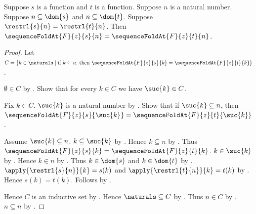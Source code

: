 \begin{proposition}\label{sequence_fold_at_prefix_extensional}
    Suppose $s$ is a function and $t$ is a function.
    Suppose $n$ is a natural number.
    Suppose $n\subseteq\dom{s}$ and $n\subseteq\dom{t}$.
    Suppose $\restrl{s}{n}=\restrl{t}{n}$.
    Then $\sequenceFoldAt{F}{z}{s}{n}
        =\sequenceFoldAt{F}{z}{t}{n}$.
\end{proposition}
\begin{proof}
    Let $C=\{k\in\naturals\mid
        \text{if $k\subseteq n$, then
            $\sequenceFoldAt{F}{z}{s}{k}
                =\sequenceFoldAt{F}{z}{t}{k}$}\}$.

    $\emptyset\in C$
        by .
    Show that for every $k\in C$ we have $\suc{k}\in C$.
    \begin{subproof}
        Fix $k\in C$.
        $\suc{k}$ is a natural number by .
        Show that if $\suc{k}\subseteq n$, then
            $\sequenceFoldAt{F}{z}{s}{\suc{k}}
                =\sequenceFoldAt{F}{z}{t}{\suc{k}}$.
        \begin{subproof}
            Assume $\suc{k}\subseteq n$.
            $k\subseteq\suc{k}$ by .
            Hence $k\subseteq n$ by .
            Thus $\sequenceFoldAt{F}{z}{s}{k}
                =\sequenceFoldAt{F}{z}{t}{k}$.
            $k\in\suc{k}$ by .
            Hence $k\in n$ by .
            Thus $k\in\dom{s}$ and $k\in\dom{t}$
                by .
            $\apply{\restrl{s}{n}}{k}=s(k)$ and
                $\apply{\restrl{t}{n}}{k}=t(k)$
                by .
            Hence $s(k)=t(k)$.
            Follows by .
        \end{subproof}
    \end{subproof}
    Hence $C$ is an inductive set by .
    Hence $\naturals\subseteq C$ by .
    Thus $n\in C$ by .
    $n\subseteq n$ by .
\end{proof}

